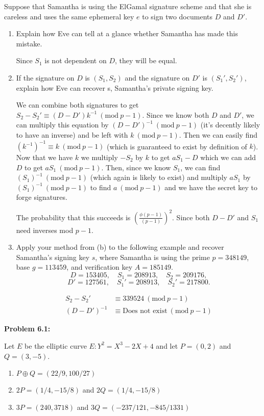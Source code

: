 \documentclass[a4paper, 11pt]{article}
\newcommand{\Mod}[1]{\ (\mathrm{mod}\ #1)}
\begin{document}
    Suppose that Samantha is using the ElGamal signature scheme and that she is careless and uses the same ephemeral key $e$ to sign two documents $D$ and $D'$.
    \begin{enumerate}[label=(\alph*)]
        \item Explain how Eve can tell at a glance whether Samantha has made this mistake.
        
        Since $S_1$ is not dependent on $D$, they will be equal.
        
        \item If the signature on $D$ is $(S_1 , S_2 )$ and the signature on $D'$ is $(S_1' , S_2' )$, explain how Eve can recover s, Samantha’s private signing key.
        
        We can combine both signatures to get $S_2 - S_2' \equiv (D-D')k^{-1} \Mod{p-1}$. Since we know both $D$ and $D'$, we can multiply this equation by $(D-D')^{-1} \Mod{p-1}$ (it's decently likely to have an inverse) and be left with $k \Mod{p-1}$. Then we can easily find $(k^{-1})^{-1} \equiv k \Mod{p-1}$ (which is guaranteed to exist by definition of $k$). Now that we have $k$ we multiply $-S_2$ by $k$ to get $aS_1 - D$ which we can add $D$ to get $aS_1 \Mod{p-1}$. Then, since we know $S_1$, we can find $(S_1)^{-1}\Mod{p-1}$ (which again is likely to exist) and multiply $aS_1$ by $(S_1)^{-1}\Mod{p-1}$ to find $a\Mod{p-1}$ and we have the secret key to forge signatures. 
        
        The probability that this succeeds is $\left(\frac{\phi(p-1)}{(p-1)}\right)^2$. Since both $D-D'$ and $S_1$ need inverses mod $p-1$.
        \item Apply your method from (b) to the following example and recover Samantha’s signing key $s$, where Samantha is using the prime $p = 348149$, base $g = 113459$, and verification key $A = 185149.$
        $$D = 153405,\quad S_1 = 208913,\quad S_2 = 209176,$$ $$D' = 127561,\quad S_1' = 208913,\quad S_2' = 217800.$$
        
        \begin{align*}
            S_2-S_2' &\equiv 339524 \Mod{p-1}\\
            (D-D')^{-1} &\equiv \text{Does not exist} \Mod{p-1}
        \end{align*}
    \end{enumerate}
    
    
    
\noindent\textbf{Problem 6.1:}
    
    Let $E$ be the elliptic curve $E: Y^2 = X^3 -2X + 4$ and let $P=(0,2)$ and $Q = (3,-5)$.
    \begin{enumerate}[label=(\alph*)]
        \item $P \oplus Q = (22/9 , 100/27)$
        \item $2P = (1/4 , -15/8)$ and $2Q =(1/4 , -15/8)$ 
        \item $3P = (240 , 3718)$ and $3Q = (-237/121 , -845/1331)$
        
            
    \end{enumerate}
    
\end{document}
